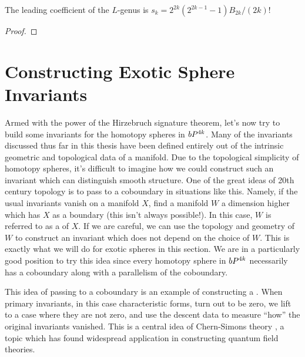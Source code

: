 
\begin{proposition}\label{prop:leading_coefficient_L_genus}
	The leading coefficient of the $L$-genus is $s_k=2^{2k}(2^{2k-1}-1)B_{2k}/(2k)!$
\end{proposition}
\begin{proof}
\end{proof}

\section{Constructing Exotic Sphere Invariants}\label{sec:constructing-exotic-sphere-invariants}

Armed with the power of the Hirzebruch signature theorem, let's now try to build some invariants for the homotopy spheres in $bP^{4k}$.
Many of the invariants discussed thus far in this thesis have been defined entirely out of the intrinsic geometric and topological data of a manifold. Due to the topological simplicity of homotopy spheres, it's difficult to imagine how we could construct such an invariant which can distinguish smooth structure. One of the great ideas of 20th century topology is to pass to a coboundary in situations like this. Namely, if the usual invariants vanish on a manifold $X$, find a manifold $W$ a dimension higher which has $X$ as a boundary (this isn't always possible!). In this case, $W$ is referred to as a  of $X$. If we are careful, we can use the topology and geometry of $W$ to construct an invariant which does not depend on the choice of $W$. This is exactly what we will do for exotic spheres in this section. We are in a particularly good position to try this idea since every homotopy sphere in $bP^{4k}$ necessarily has a coboundary along with a parallelism of the coboundary.

\begin{remark}
	This idea of passing to a coboundary is an example of constructing a . When primary invariants, in this case characteristic forms, turn out to be zero, we lift to a case where they are not zero, and use the descent data to measure ``how'' the original invariants vanished. This is a central idea of Chern-Simons theory \cite{chernsimons1974geometricinvariants}, a topic which has found widespread application in constructing quantum field theories. 
\end{remark}

